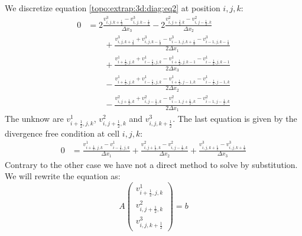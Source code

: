 We discretize equation \ref{topo:extrap:3d:diag:eq2} at position $i,j,k$:
\begin{equation}\label{extrap:3d:3:eq2}
 \begin{split}
	0&=2\frac{v^{3}_{i,j,k+\frac{1}{2}}-v^{3}_{i,j,k-\frac{1}{2}}}{\Delta x_3}-2\frac{v^{2}_{i,j+\frac{1}{2}.k}-v^{2}_{i,j-\frac{1}{2},k}}{\Delta x_2}\\
	&\qquad +\frac{v^{3}_{i,j,k+\frac{1}{2}}+v^{3}_{i,j,k-\frac{1}{2}}-v^{3}_{i-1,j,k+\frac{1}{2}}-v^{3}_{i-1,j,k-\frac{1}{2}}}{2\Delta x_1}\\
	&\qquad +\frac{v^{1}_{i+\frac{1}{2},j,k}+v^1_{i-\frac{1}{2},j,k}-v^{1}_{i+\frac{1}{2},j,k-1}-v^{1}_{i-\frac{1}{2},j,k-1}}{2\Delta x_3}\\
	&\qquad -\frac{v^{1}_{i+\frac{1}{2},j,k}+v^{1}_{i-\frac{1}{2},j,k}-v^{1}_{i+\frac{1}{2},j-1,k}-v^{1}_{i-\frac{1}{2},j-1,k}}{2\Delta x_2}\\
	&\qquad -\frac{v^{2}_{i,j+\frac{1}{2},k}+v^2_{i,j-\frac{1}{2},k}-v^{2}_{i-1,j+\frac{1}{2},k}-v^{2}_{i-1,j-\frac{1}{2},k}}{2\Delta x_1}
\end{split}
	\end{equation}
The unknow are $v^{1}_{i+\frac{1}{2},j,k}$, $v^2_{i,j+\frac{1}{2},k}$ and $v^{3}_{i,j,k+\frac{1}{2}}$.
The last equation is given by the divergence free condition at cell $i,j,k$:
\begin{align}\label{extrap:3d:3:div}
 0&=\frac{v^{1}_{i+\frac{1}{2},j,k}-v^{1}_{i-\frac{1}{2},j,k}}{\Delta x_1}+\frac{v^{2}_{i,j+\frac{1}{2},k}-v^{2}_{i,j-\frac{1}{2},k}}{\Delta x_2}+\frac{v^{3}_{i,j,k+\frac{1}{2}}-v^{3}_{i,j,k+\frac{1}{2}}}{\Delta x_3}
\end{align}
Contrary to the other case we have not a direct method to solve by substitution. We will rewrite the equation as:
\begin{equation}
 A\begin{pmatrix}
   v^{1}_{i+\frac{1}{2},j,k}\\
   v^2_{i,j+\frac{1}{2},k}\\
   v^{3}_{i,j,k+\frac{1}{2}}
  \end{pmatrix}=b
\end{equation}

